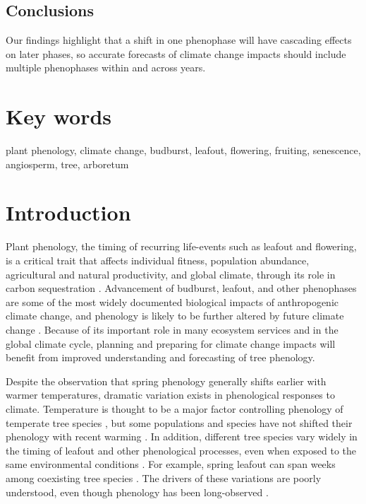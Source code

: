 \documentclass{article}
\begin{document}
\subsection*{Conclusions}
Our findings highlight that a shift in one phenophase will have cascading effects on later phases, so accurate forecasts of climate change impacts should include multiple phenophases within and across years. 

\section* {Key words}
plant phenology, climate change, budburst, leafout, flowering, fruiting, senescence, angiosperm, tree, arboretum
\section* {Introduction}
Plant phenology, the timing of recurring life-events such as leafout and flowering, is a critical trait that affects individual fitness, population abundance, agricultural and natural productivity, and global climate, through its role in carbon sequestration \citep{cleland2007,miller-rushing2008,primack2009a,willis2010,miller-rushing2010}. Advancement of budburst, leafout, and other phenophases are some of the most widely documented biological impacts of anthropogenic climate change, and phenology is likely to be further altered by future climate change \citep{parmesan2006}. Because of its important role in many ecosystem services and in the global climate cycle, planning and preparing for climate change impacts will benefit from improved understanding and forecasting of tree phenology.
\par Despite the observation that spring phenology generally shifts earlier with warmer temperatures, dramatic variation exists in phenological responses to climate. Temperature is thought to be a major factor controlling phenology of temperate tree species \citep{parmesan2006, morin2010,schwartz2013}, but some populations and species have not shifted their phenology with recent warming \citep{wolkovich2012}. In addition, different tree species vary widely in the timing of leafout and other phenological processes, even when exposed to the same environmental conditions \citep{lechowicz1984,primack2009c}. For example, spring leafout can span weeks among coexisting tree species \citep{lechowicz1984}. The drivers of these variations are poorly understood, even though phenology has been long-observed \citep{wolkovich2014}.
\end{document}
